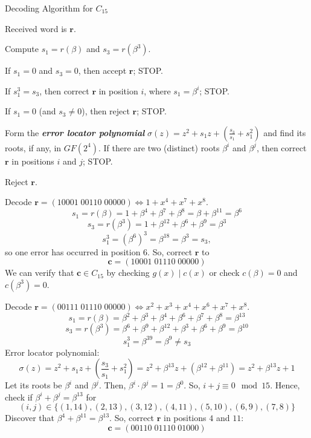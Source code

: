 \begin{algbox}
    \begin{algorithm}[H]
        \caption{Decoding Algorithm for $ C_{15} $}
        Received word is $ \bm{r} $.

        Compute $ s_1=r(\beta) $ and $ s_3=r(\beta^3) $.

        If $ s_1=0 $ and $ s_3=0 $, then accept $ \bm{r} $; STOP.

        If $ s_1^3=s_3 $, then correct $ \bm{r} $ in position $ i $,
        where $ s_1=\beta^i $; STOP.

        If $ s_1=0 $ (and $ s_3\neq 0 $), then reject $ \bm{r} $; STOP.

        Form the \textbf\emph{{error locator polynomial}}
        $ \sigma(z)=z^2+s_1z+\left( \frac{s_3}{s_1} +s_1^2 \right) $ and find its
        roots, if any, in $ GF(2^4) $. If there are two (distinct) roots $ \beta^i $
        and $ \beta^j $, then correct $ \bm{r} $ in positions $ i $ and $ j $; STOP.

        Reject $ \bm{r} $.
    \end{algorithm}
\end{algbox}

\begin{exbox}
    \begin{example}[Decoding $ C_{15} $]
        Decode $ \bm{r}=(10001\; 00110\; 00000)\iff 1+x^4+x^7+x^8 $.
        \[ s_1=r(\beta)=1+\beta^4+\beta^7+\beta^8=\beta+\beta^{11}=\beta^6 \]
        \[ s_3=r(\beta^3)=1+\beta^{12}+\beta^{6}+\beta^9=\beta^3 \]
        \[ s_1^3=(\beta^6)^3=\beta^{18}=\beta^3=s_3, \]
        so one error has occurred in position $ 6 $. So, correct $ \bm{r} $ to
        \[ \bm{c}=(10001\; 01110\; 00000) \]
        We can verify that $ \bm{c}\in C_{15} $ by checking $ g(x)\mid c(x) $
        or check $ c(\beta)=0 $ and $ c(\beta^3)=0 $.
    \end{example}
\end{exbox}

\begin{exbox}
    \begin{example}[Decoding $ C_{15} $]
        Decode $ \bm{r}=(00111\; 01110\; 00000)\iff x^2+x^3+x^4+x^6+x^7+x^8 $.
        \[ s_1=r(\beta)=\beta^2+\beta^3+\beta^4+\beta^6+\beta^7+\beta^8=\beta^{13} \]
        \[ s_3=r(\beta^3)=\beta^6+\beta^9+\beta^{12}+\beta^3+\beta^6+\beta^9=\beta^{10} \]
        \[ s_1^3=\beta^{39}=\beta^9\neq s_3 \]
        Error locator polynomial:
        \[ \sigma(z)=z^2+s_1z+\left(\frac{s_3}{s_1}+s_1^2 \right)
            =z^2+\beta^{13}z+(\beta^{12}+\beta^{11})=z^2+\beta^{13}z+1 \]
        Let its roots be $ \beta^i $ and $ \beta^j $. Then, $ \beta^i\cdot \beta^j=1=
            \beta^0 $. So, $ i+j\equiv 0\mod 15 $. Hence, check if $ \beta^i+\beta^j=\beta^{13} $
        for
        \[ (i,j)\in \{(1,14),(2,13),(3,12),(4,11),(5,10),(6,9),(7,8)\} \]
        Discover that $ \beta^4+\beta^{11}=\beta^{13} $. So, correct $ \bm{r} $
        in positions $ 4 $ and $ 11 $:
        \[ \bm{c}=(00110\; 01110\; 01000) \]
    \end{example}
\end{exbox}

